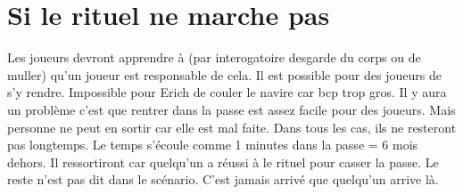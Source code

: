 \documentclass[oneside,12pt]{book}
\begin{document}
\begin{flushleft}
\section{Si le rituel ne marche pas}
Les joueurs devront  apprendre à (par interogatoire desgarde du corps ou de muller) qu'un joueur est responsable de cela. Il est possible pour des joueurs de s'y rendre.
Impossible pour Erich de couler le navire car bcp trop gros. Il y aura un problème c'est que rentrer dans la passe est assez facile pour des joueurs. Mais personne ne peut en sortir car elle est mal faite. Dans tous les cas, ils ne resteront pas longtemps. Le temps s'écoule comme 1 minutes dans la passe = 6 mois dehors. Il ressortiront car quelqu'un a réussi à le rituel pour casser la passe. Le reste n'est pas dit dans le scénario. C'est jamais arrivé que quelqu'un arrive là. 

\section{}


\end{flushleft}
\end{document}
